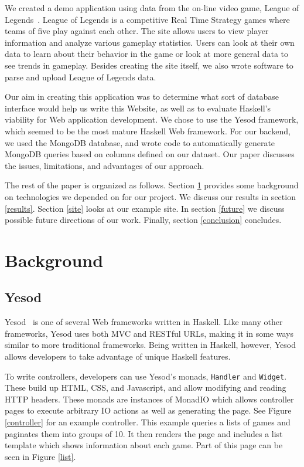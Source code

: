 \documentclass[letterpaper,twocolumn,9pt]{article}
\newcommand{\code}[1]{\texttt{#1}}
\begin{document}
We created a demo application using data from the on-line video game, League of Legends~\cite{lol}. League of Legends is a competitive Real Time Strategy games where teams of five play against each other. The site allows users to view player information and analyze various gameplay statistics. Users can look at their own data to learn about their behavior in the game or look at more general data to see trends in gameplay. Besides creating the site itself, we also wrote software to parse and upload League of Legends data. 

Our aim in creating this application was to determine what sort of database interface would help us write this Website, as well as to evaluate Haskell's viability for Web application development. We chose to use the Yesod framework, which seemed to be the most mature Haskell Web framework. For our backend, we used the MongoDB\cite{mongo} database, and wrote code to automatically generate MongoDB queries based on columns defined on our dataset. Our paper discusses the issues, limitations, and advantages of our approach.

The rest of the paper is organized as follows. Section \ref{sec:background} provides some background on technologies we depended on for our project. We discuss our results in section \ref{results}. Section \ref{site} looks at our example site. In section \ref{future} we discuss possible future directions of our work. Finally, section \ref{conclusion} concludes.

\section{Background}
\label{sec:background}

\subsection{Yesod}

Yesod~\cite{yesod} is one of several Web frameworks written in Haskell. Like many other frameworks, Yesod uses both MVC and RESTful URLs, making it in some ways similar to more traditional frameworks. Being written in Haskell, however, Yesod allows developers to take advantage of unique Haskell features.

To write controllers, developers can use Yesod's monads, \code{Handler} and \code{Widget}. These build up HTML, CSS, and Javascript, and allow modifying and reading HTTP headers. These monads are instances of MonadIO which allows controller pages to execute arbitrary IO actions as well as generating the page. See Figure \ref{controller} for an example controller. This example queries a lists of games and paginates them into groups of 10. It then renders the page and includes a list template which shows information about each game. Part of this page can be seen in Figure \ref{list}.
\end{document}
